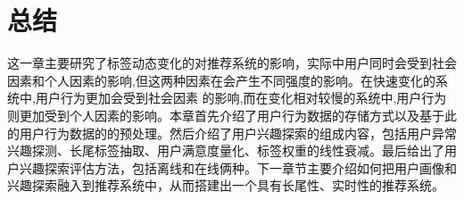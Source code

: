 \section{总结}
这一章主要研究了标签动态变化的对推荐系统的影响，实际中用户同时会受到社会因素和个人因素的影响,但这两种因素在会产生不同强度的影响。在快速变化的系统中,用户行为更加会受到社会因素 的影响,而在变化相对较慢的系统中,用户行为则更加受到个人因素的影响。本章首先介绍了用户行为数据的存储方式以及基于此的用户行为数据的的预处理。然后介绍了用户兴趣探索的组成内容，包括用户异常兴趣探测、长尾标签抽取、用户满意度量化、标签权重的线性衰减。最后给出了用户兴趣探索评估方法，包括离线和在线俩种。下一章节主要介绍如何把用户画像和兴趣探索融入到推荐系统中，从而搭建出一个具有长尾性、实时性的推荐系统。